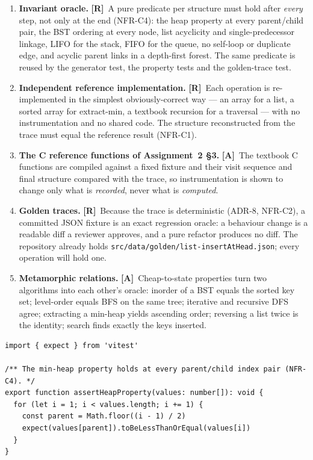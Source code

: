 \documentclass[11pt,a4paper]{article}
\newcommand{\R}{\textcolor{reqc}{\textbf{[R]}}}     %
\newcommand{\A}{\textcolor{asmc}{\textbf{[A]}}}     %
\newcommand{\ct}[1]{\texttt{#1}}
\begin{document}
\begin{enumerate}[leftmargin=1.6em,topsep=2pt,itemsep=2pt]
  \item \textbf{Invariant oracle.} \R\ A pure predicate per structure must hold after
        \emph{every} step, not only at the end (NFR-C4): the heap property at every
        parent/child pair, the BST ordering at every node, list acyclicity and
        single-predecessor linkage, LIFO for the stack, FIFO for the queue, no self-loop or
        duplicate edge, and acyclic parent links in a depth-first forest. The same predicate is
        reused by the generator test, the property tests and the golden-trace test.
  \item \textbf{Independent reference implementation.} \R\ Each operation is re-implemented in
        the simplest obviously-correct way --- an array for a list, a sorted array for
        extract-min, a textbook recursion for a traversal --- with no instrumentation and no
        shared code. The structure reconstructed from the trace must equal the reference
        result (NFR-C1).
  \item \textbf{The C reference functions of Assignment~2 \S3.} \A\ The textbook C functions are
        compiled against a fixed fixture and their visit sequence and final structure compared
        with the trace, so instrumentation is shown to change only what is \emph{recorded},
        never what is \emph{computed}.
  \item \textbf{Golden traces.} \R\ Because the trace is deterministic (ADR-8, NFR-C2), a
        committed JSON fixture is an exact regression oracle: a behaviour change is a readable
        diff a reviewer approves, and a pure refactor produces no diff. The repository already
        holds \ct{src/data/golden/list-insertAtHead.json}; every operation will hold one.
  \item \textbf{Metamorphic relations.} \A\ Cheap-to-state properties turn two algorithms into
        each other's oracle: inorder of a BST equals the sorted key set; level-order equals BFS
        on the same tree; iterative and recursive DFS agree; extracting a min-heap yields
        ascending order; reversing a list twice is the identity; search finds exactly the keys
        inserted.
\end{enumerate}

\begin{lstlisting}[style=ts,caption={The invariant oracle in the shape every structure
follows: a pure predicate over the model, asserted in the generator test (here, the min-heap
property) and reused by the property tests of \S3.7.},label={lst:invariant}]
import { expect } from 'vitest'

/** The min-heap property holds at every parent/child index pair (NFR-C4). */
export function assertHeapProperty(values: number[]): void {
  for (let i = 1; i < values.length; i += 1) {
    const parent = Math.floor((i - 1) / 2)
    expect(values[parent]).toBeLessThanOrEqual(values[i])
  }
}
\end{lstlisting}
\end{document}
